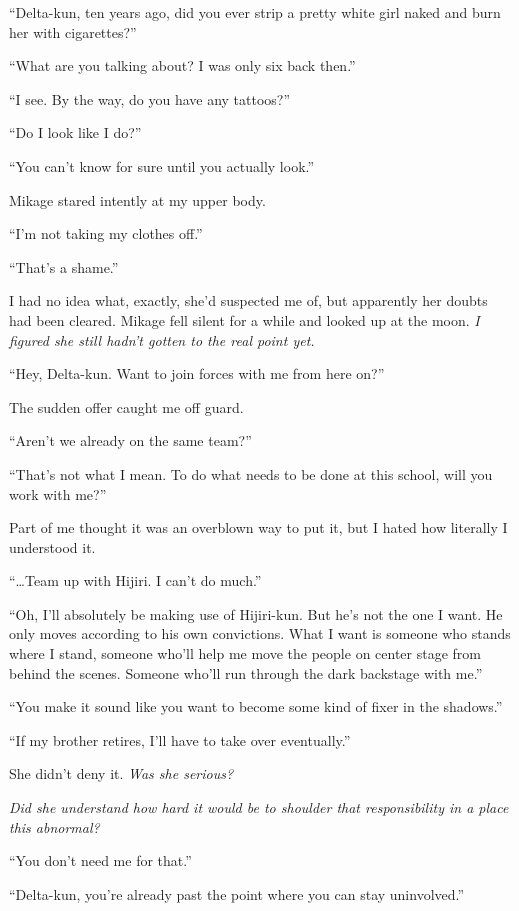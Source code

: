 \documentclass[
    a4paper,
    12pt,
    twoside,
    openany,
    UTF8,
    fontset=windows
]{ctexbook}
\begin{document}
``Delta-kun, ten years ago, did you ever strip a pretty white girl naked and burn her with cigarettes?''

``What are you talking about? I was only six back then.''

``I see. By the way, do you have any tattoos?''

``Do I look like I do?''

``You can't know for sure until you actually look.''

Mikage stared intently at my upper body.

``I'm not taking my clothes off.''

``That's a shame.''

I had no idea what, exactly, she'd suspected me of, but apparently her doubts had been cleared. Mikage fell silent for a while and looked up at the moon. \textit{I figured she still hadn't gotten to the real point yet.}

``Hey, Delta-kun. Want to join forces with me from here on?''

The sudden offer caught me off guard.

``Aren't we already on the same team?''

``That's not what I mean. To do what needs to be done at this school, will you work with me?''

Part of me thought it was an overblown way to put it, but I hated how literally I understood it.

``\dots Team up with Hijiri. I can't do much.''

``Oh, I'll absolutely be making use of Hijiri-kun. But he's not the one I want. He only moves according to his own convictions. What I want is someone who stands where I stand, someone who'll help me move the people on center stage from behind the scenes. Someone who'll run through the dark backstage with me.''

``You make it sound like you want to become some kind of fixer in the shadows.''

``If my brother retires, I'll have to take over eventually.''

She didn't deny it. \textit{Was she serious?}

\textit{Did she understand how hard it would be to shoulder that responsibility in a place this abnormal?}

``You don't need me for that.''

``Delta-kun, you're already past the point where you can stay uninvolved.''
\end{document}
